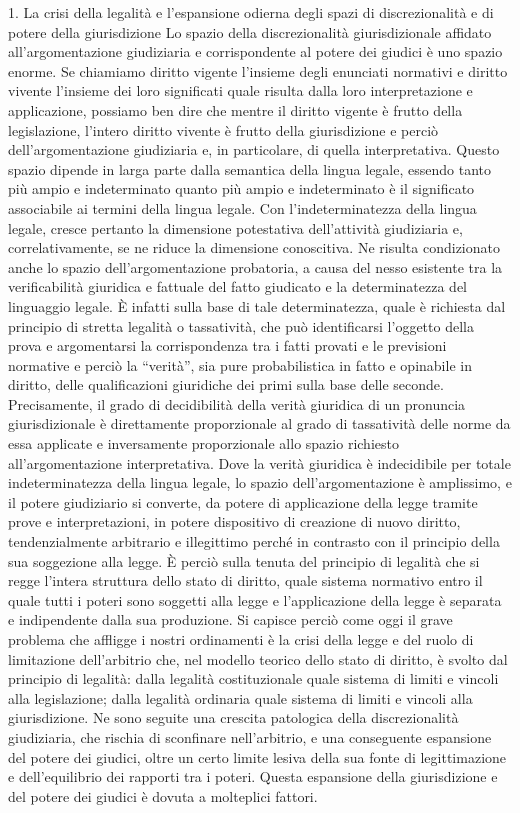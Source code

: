 1. La crisi della legalità e l’espansione odierna degli spazi di discrezionalità e di potere della giurisdizione
Lo spazio della discrezionalità giurisdizionale affidato all’argomentazione giudiziaria e corrispondente al potere dei giudici è uno spazio enorme. Se chiamiamo diritto vigente l’insieme degli enunciati normativi e diritto vivente l’insieme dei loro significati quale risulta dalla loro interpretazione e applicazione, possiamo ben dire che mentre il diritto vigente è frutto della legislazione, l’intero diritto vivente è frutto della giurisdizione e perciò dell’argomentazione giudiziaria e, in particolare, di quella interpretativa.
Questo spazio dipende in larga parte dalla semantica della lingua legale, essendo tanto più ampio e indeterminato quanto più ampio e indeterminato è il significato associabile ai termini della lingua legale. Con l’indeterminatezza della lingua legale, cresce pertanto la dimensione potestativa dell’attività giudiziaria e, correlativamente, se ne riduce la dimensione conoscitiva. Ne risulta condizionato anche lo spazio dell’argomentazione probatoria, a causa del nesso esistente tra la verificabilità giuridica e fattuale del fatto giudicato e la determinatezza del linguaggio legale. È infatti sulla base di tale determinatezza, quale è richiesta dal principio di stretta legalità o tassatività, che può identificarsi l’oggetto della prova e argomentarsi la corrispondenza tra i fatti provati e le previsioni normative e perciò la “verità”, sia pure probabilistica in fatto e opinabile in diritto, delle qualificazioni giuridiche dei primi sulla base delle seconde. Precisamente, il grado di decidibilità della verità giuridica di un pronuncia giurisdizionale è direttamente proporzionale al grado di tassatività delle norme da essa applicate e inversamente proporzionale allo spazio richiesto all’argomentazione interpretativa. Dove la verità giuridica è indecidibile per totale indeterminatezza della lingua legale, lo spazio dell’argomentazione è amplissimo, e il potere giudiziario si converte, da potere di applicazione della legge tramite prove e interpretazioni, in potere dispositivo di creazione di nuovo diritto, tendenzialmente arbitrario e illegittimo perché in contrasto con il principio della sua soggezione alla legge. È perciò sulla tenuta del principio di legalità che si regge l’intera struttura dello stato di diritto, quale sistema normativo entro il quale tutti i poteri sono soggetti alla legge e l’applicazione della legge è separata e indipendente dalla sua produzione.
Si capisce perciò come oggi il grave problema che affligge i nostri ordinamenti è la crisi della legge e del ruolo di limitazione dell’arbitrio che, nel modello teorico dello stato di diritto, è svolto dal principio di legalità: dalla legalità costituzionale quale sistema di limiti e vincoli alla legislazione; dalla legalità ordinaria quale sistema di limiti e vincoli alla giurisdizione. Ne sono seguite una crescita patologica della discrezionalità giudiziaria, che rischia di sconfinare nell’arbitrio, e una conseguente espansione del potere dei giudici, oltre un certo limite lesiva della sua fonte di legittimazione e dell’equilibrio dei rapporti tra i poteri. Questa espansione della giurisdizione e del potere dei giudici è dovuta a molteplici fattori.
